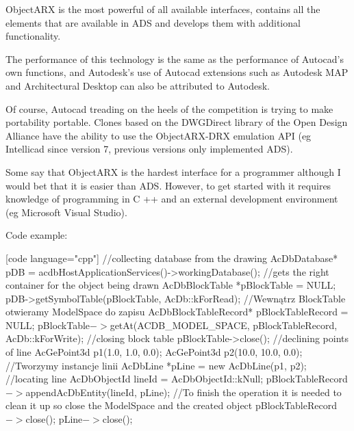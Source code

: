 \documentclass[a4paper, 11pt, article]{report}
\begin{document}
{{ObjectARX is the most powerful of all available interfaces, contains all the elements that are available in ADS and develops them with additional functionality.

The performance of this technology is the same as the performance of Autocad's own functions, and Autodesk's use of Autocad extensions such as Autodesk MAP and Architectural Desktop can also be attributed to Autodesk.

Of course, Autocad treading on the heels of the competition is trying to make portability portable. Clones based on the DWGDirect library of the Open Design Alliance have the ability to use the ObjectARX-DRX emulation API (eg Intellicad since version 7, previous versions only implemented ADS).

Some say that ObjectARX is the hardest interface for a programmer although I would bet that it is easier than ADS. However, to get started with it requires knowledge of programming in C ++ and an external development environment (eg Microsoft Visual Studio).

Code example:

[code language="cpp"] //collecting database from the drawing \newline
AcDbDatabase* pDB = acdbHostApplicationServices()->workingDatabase(); 
//gets the right container for the object being drawn \newline
AcDbBlockTable *pBlockTable = NULL; \newline
pDB->getSymbolTable(pBlockTable, AcDb::kForRead); 
//Wewnątrz BlockTable otwieramy ModelSpace do zapisu \newline
AcDbBlockTableRecord* pBlockTableRecord = NULL; \newline
pBlockTable\(->\)getAt(ACDB_MODEL_SPACE, pBlockTableRecord, AcDb::kForWrite); 
//closing block table \newline
pBlockTable->close();
//declining points of line \newline
AcGePoint3d p1(1.0, 1.0, 0.0);
AcGePoint3d p2(10.0, 10.0, 0.0);
//Tworzymy instancje linii \newline
AcDbLine *pLine = new AcDbLine(p1, p2);
//locating line \newline
AcDbObjectId lineId = AcDbObjectId::kNull; \newline
pBlockTableRecord\(->\)appendAcDbEntity(lineId, pLine);
//To finish the operation it is needed to clean it up so close the ModelSpace and the created object \newline
pBlockTableRecord\(->\)close(); \newline
pLine\(->\)close(); \newline
[/code] \newline

}}
\end{document}
